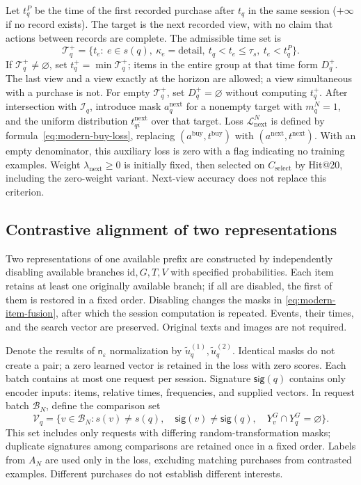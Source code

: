 \documentclass[12pt,a4paper]{article}
\newcommand{\eps}{\varepsilon}
\theoremstyle{plainru}
\begin{document}
Let $t_q^P$ be the time of the first recorded purchase after $t_q$
in the same session ($+\infty$ if no record exists).
The target is the next recorded view, with no claim
that actions between records are complete. The admissible time set is
\begin{equation}\label{eq:modern-next-time}
\mathcal T_q^+=\{t_e:\ e\in s(q),\ \kappa_e=\mathrm{detail},\
t_q<t_e\le\tau_s,\ t_e<t_q^P\}.
\end{equation}
If $\mathcal T_q^+\ne\varnothing$, set $t_q^+=\min\mathcal T_q^+$;
items in the entire group at that time form $D_q^+$.
The last view and a view exactly at the horizon are allowed;
a view simultaneous with a purchase is not. For empty $\mathcal T_q^+$,
set $D_q^+=\varnothing$ without computing $t_q^+$.
After intersection with $\mathcal I_q$, introduce mask
$a_q^{\mathrm{next}}$ for a nonempty target with $m_q^N=1$, and the uniform distribution
$t_{qi}^{\mathrm{next}}$ over that target.
Loss $\mathcal L_{\mathrm{next}}^N$ is defined by
formula~\eqref{eq:modern-buy-loss}, replacing
$(a^{\mathrm{buy}},t^{\mathrm{buy}})$ with
$(a^{\mathrm{next}},t^{\mathrm{next}})$.
With an empty denominator, this auxiliary loss is zero
with a flag indicating no training examples.
Weight $\lambda_{\mathrm{next}}\ge0$ is initially fixed,
then selected on $C_{\mathrm{select}}$ by Hit@20, including the zero-weight variant.
Next-view accuracy does not replace this criterion.

\subsection{Contrastive alignment of two representations}
\label{sec:modern-contrastive}

Two representations of one available prefix are constructed
by independently disabling available branches
$\mathrm{id},G,T,V$ with specified probabilities.
Each item retains at least one originally available branch;
if all are disabled, the first of them is restored
in a fixed order. Disabling changes the masks in
\eqref{eq:modern-item-fusion}, after which the session computation is repeated.
Events, their times, and the search vector are preserved.
Original texts and images are not required.

Denote the results of $\mathsf n_\eps$ normalization by
$\tilde u_q^{(1)},\tilde u_q^{(2)}$.
Identical masks do not create a pair; a zero learned vector
is retained in the loss with zero scores.
Each batch contains at most one request per session.
Signature $\mathsf{sig}(q)$ contains only encoder inputs:
items, relative times, frequencies, and supplied vectors.
In request batch $\mathcal B_N$, define the comparison set
\begin{equation}\label{eq:modern-contrastive-negative}
\mathcal V_q=\{v\in\mathcal B_N:
s(v)\ne s(q),\quad \mathsf{sig}(v)\ne\mathsf{sig}(q),\quad
Y_v^G\cap Y_q^G=\varnothing\}.
\end{equation}
This set includes only requests with differing random-transformation
masks; duplicate signatures among comparisons
are retained once in a fixed order.
Labels from $A_N$ are used only in the loss, excluding matching purchases
from contrasted examples. Different purchases do not establish
different interests.
\end{document}
